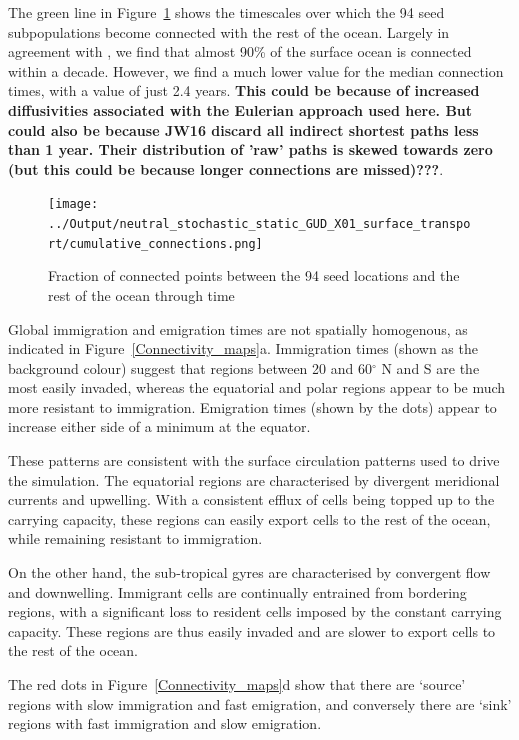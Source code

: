 \documentclass[12pt]{article}
\begin{document}
The green line in Figure~\ref{Cumulative} shows the timescales over which the 94 seed subpopulations become connected with the rest of the ocean. Largely in agreement with \citet{Jonsson:2016}, we find that almost 90\% of the surface ocean is connected within a decade. However, we find a much lower value for the median connection times, with a value of just 2.4 years. \textbf{This could be because of increased diffusivities associated with the Eulerian approach used here. But could also be because JW16 discard all indirect shortest paths less than 1 year. Their distribution of 'raw' paths is skewed towards zero (but this could be because longer connections are missed)???}.

\begin{figure}[htp!]
    \centering
        \texttt{[image: ../Output/neutral\_stochastic\_static\_GUD\_X01\_surface\_transport/cumulative\_connections.png]}
\caption{Fraction of connected points between the 94 seed locations and  the rest of the ocean through time}
\label{Cumulative}
\end{figure}

Global immigration and emigration times are not spatially homogenous, as indicated in Figure~\ref{Connectivity_maps}a. Immigration times (shown as the background colour) suggest that regions between 20 and 60$^\circ$ N and S are the most easily invaded, whereas the equatorial and polar regions appear to be much more resistant  to immigration. Emigration times (shown by the dots) appear to increase either side of a minimum at the equator. 

These patterns are consistent with the surface circulation patterns used to drive the simulation. The equatorial regions are characterised by divergent meridional currents and upwelling. With a consistent efflux of cells being topped up to the carrying capacity, these regions can easily export cells to the rest of the ocean, while remaining resistant to immigration. 

On the other hand, the sub-tropical gyres are characterised by convergent flow and downwelling. Immigrant cells are continually entrained from bordering regions, with a significant loss to resident cells imposed by the constant carrying capacity. These regions are thus easily invaded and are slower to export cells to the rest of the ocean.

The red dots in Figure~\ref{Connectivity_maps}d show that there are `source' regions with slow immigration and fast emigration, and conversely there are `sink' regions with fast immigration and slow emigration.
\end{document}
